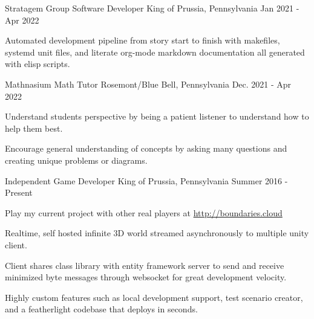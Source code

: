 

\begin{cventries}

  \cventry
    {Stratagem Group} %
    {Software Developer} %
    {King of Prussia, Pennsylvania} %
    {Jan 2021 - Apr 2022} %
    {
      \begin{cvitems} %
        \item {Automated development pipeline from story start to finish
               with makefiles, systemd unit files, and literate org-mode markdown documentation
               all generated with elisp scripts.}
      \end{cvitems}
    }

  \cventry
    {Mathnasium} %
    {Math Tutor} %
    {Rosemont/Blue Bell, Pennsylvania} %
    {Dec. 2021 - Apr 2022} %
    {
      \begin{cvitems} %
        \item {Understand students perspective by being a patient listener to understand how to help them best.}
        \item {Encourage general understanding of concepts by asking many questions and creating unique problems or diagrams.}
      \end{cvitems}
    }

  \cventry
    {Independent} %
    {Game Developer} %
    {King of Prussia, Pennsylvania} %
    {Summer 2016 - Present} %
    {
      \begin{cvitems} %
        \item {Play my current project with other real players at \url{http://boundaries.cloud}}
        \item {Realtime, self hosted infinite 3D world streamed asynchronously to multiple unity client.}
        \item {Client shares class library with entity framework server to send and receive minimized byte messages through websocket for great development velocity.}
        \item {Highly custom features such as local development support, test scenario creator, and a featherlight codebase that deploys in seconds.}
      \end{cvitems}
    }


\end{cventries}
